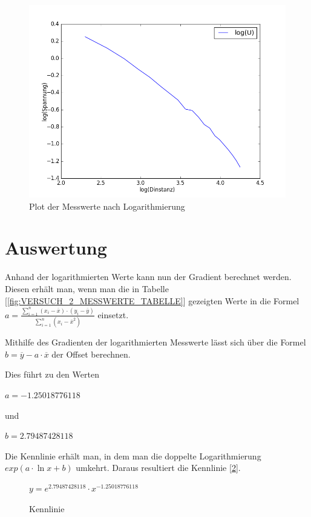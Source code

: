 \documentclass[12pt,oneside,a4paper]{report}
\begin{document}
\begin{figure}[H]
	\centering\small
	\includegraphics[width=\textwidth]{media/plot_messungen_log.png}
	\caption{Plot der Messwerte nach Logarithmierung}
	\label{fig:VERSUCH_2_MESSWERTE_PLOT}
\end{figure}

\section{Auswertung}
\label{chap:VERSUCH_2_AUSWERTUNG}
Anhand der logarithmierten Werte kann nun der Gradient berechnet werden. Diesen erhält man, wenn man die in Tabelle [\ref{fig:VERSUCH_2_MESSWERTE_TABELLE}] gezeigten Werte in die Formel \(a = \frac{\sum_{i=1}^{n}{(x_i - \overline{x}) \cdot (y_i - \overline{y})}}{\sum_{i=1}^{n}{(x_i - \overline{x}^2)}}\) einsetzt.

Mithilfe des Gradienten der logarithmierten Messwerte lässt sich über die Formel \(b = \overline{y} - a \cdot \overline{x}\) der Offset berechnen.

Dies führt zu den Werten

\(a = -1.25018776118\)

und

\(b = 2.79487428118\)

Die Kennlinie erhält man, in dem man die doppelte Logarithmierung \(exp(a \cdot \ln x + b)\) umkehrt. Daraus resultiert die Kennlinie [\ref{fig:VERSUCH_2_AUSWERTUNG_KENNLINIE}].

\begin{figure}[H]
	\centering\small
	\(y = e^{2.79487428118} \cdot x^{-1.25018776118}\)
	\caption{Kennlinie}
	\label{fig:VERSUCH_2_AUSWERTUNG_KENNLINIE}
\end{figure}
\end{document}
